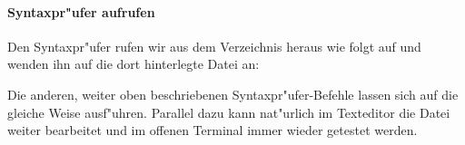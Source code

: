 \documentclass[a4paper,ngerman]{article}
\begin{document}
\paragraph{Syntaxpr"ufer aufrufen}
Den Syntaxpr"ufer rufen wir aus dem Verzeichnis  heraus wie
folgt auf und wenden ihn auf die dort hinterlegte Datei
 an:
Die anderen, weiter oben beschriebenen Syntaxpr"ufer-Befehle lassen
sich auf die gleiche Weise ausf"uhren. Parallel dazu kann nat"urlich
im Texteditor die Datei  weiter bearbeitet und im
offenen Terminal immer wieder getestet werden.
\end{document}
